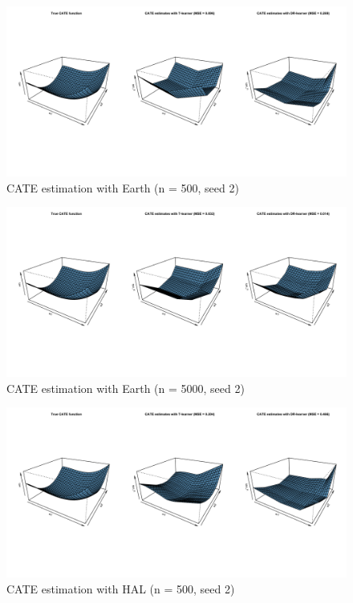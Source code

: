 \documentclass[
]{article}
\begin{document}
\begin{figure}[H]

{\centering \includegraphics[width=1\linewidth]{cate_500_2} 

}

\caption{CATE estimation with Earth (n = 500, seed 2)}\label{fig:unnamed-chunk-25}
\end{figure}

\begin{figure}[H]

{\centering \includegraphics[width=1\linewidth]{cate_5000_2} 

}

\caption{CATE estimation with Earth (n = 5000, seed 2)}\label{fig:unnamed-chunk-26}
\end{figure}

\begin{figure}[H]

{\centering \includegraphics[width=1\linewidth]{cate_500_hal_2} 

}

\caption{CATE estimation with HAL (n = 500, seed 2)}\label{fig:unnamed-chunk-27}
\end{figure}
\end{document}
